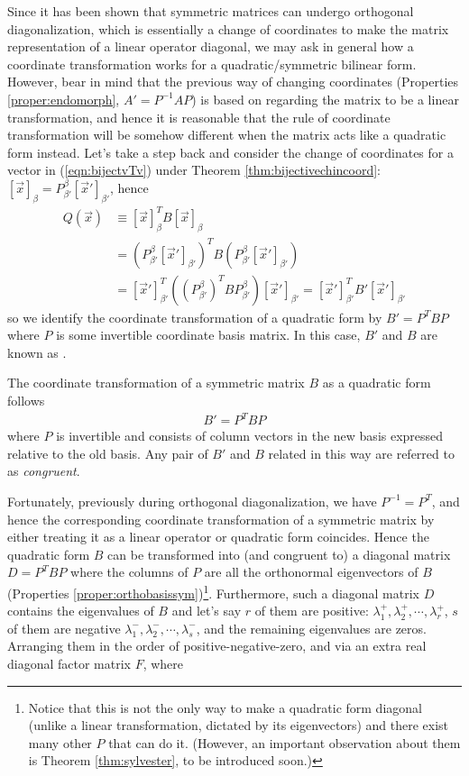 Since it has been shown that symmetric matrices can undergo orthogonal diagonalization, which is essentially a change of coordinates to make the matrix representation of a linear operator diagonal, we may ask in general how a coordinate transformation works for a quadratic/symmetric bilinear form. However, bear in mind that the previous way of changing coordinates (Properties \ref{proper:endomorph}, $A' = P^{-1}AP$) is based on regarding the matrix to be a linear transformation, and hence it is reasonable that the rule of coordinate transformation will be somehow different when the matrix acts like a quadratic form instead. Let's take a step back and consider the change of coordinates for a vector in (\ref{eqn:bijectvTv}) under Theorem \ref{thm:bijectivechincoord}: $[\vec{x}]_\beta = P_{\beta'}^\beta [\vec{x}']_{\beta'}$, hence
\begin{align*}
Q(\vec{x}) &\equiv [\vec{x}]_\beta^T B [\vec{x}]_\beta \\
&= (P_{\beta'}^\beta [\vec{x}']_{\beta'})^T B (P_{\beta'}^\beta [\vec{x}']_{\beta'}) \\
&= [\vec{x}']_{\beta'}^T ((P_{\beta'}^\beta)^T B P_{\beta'}^\beta) [\vec{x}']_{\beta'} = [\vec{x}']_{\beta'}^T B' [\vec{x}']_{\beta'} 
\end{align*}
so we identify the coordinate transformation of a quadratic form by $B' = P^TBP$ where $P$ is some invertible coordinate basis matrix. In this case, $B'$ and $B$ are known as .
\begin{defn}
\label{defn:coordtransquad}
The coordinate transformation of a symmetric matrix $B$ as a quadratic form follows
\begin{align}
B' = P^TBP
\end{align}
where $P$ is invertible and consists of column vectors in the new basis expressed relative to the old basis. Any pair of $B'$ and $B$ related in this way are referred to as \textit{congruent}.
\end{defn}
Fortunately, previously during orthogonal diagonalization, we have $P^{-1} = P^T$, and hence the corresponding coordinate transformation of a symmetric matrix by either treating it as a linear operator or quadratic form coincides. Hence the quadratic form $B$ can be transformed into (and congruent to) a diagonal matrix $D = P^TBP$ where the columns of $P$ are all the orthonormal eigenvectors of $B$ (Properties \ref{proper:orthobasissym})\footnote{Notice that this is not the only way to make a quadratic form diagonal (unlike a linear transformation, dictated by its eigenvectors) and there exist many other $P$ that can do it. (However, an important observation about them is Theorem \ref{thm:sylvester}, to be introduced soon.)}. Furthermore, such a diagonal matrix $D$ contains the eigenvalues of $B$ and let's say $r$ of them are positive: $\lambda_1^+, \lambda_2^+, \cdots, \lambda_r^+$, $s$ of them are negative $\lambda_1^-,  \lambda_2^-, \cdots, \lambda_s^-$, and the remaining eigenvalues are zeros. Arranging them in the order of positive-negative-zero, and via an extra real diagonal factor matrix $F$, where
